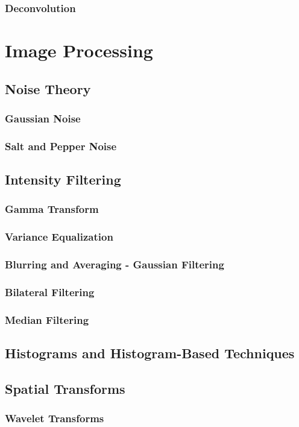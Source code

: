 \documentclass{book}
\begin{document}
				\section{Deconvolution}
			
		
		\part{Image Processing}
			\chapter{Noise Theory}
				\section{Gaussian Noise}
				\section{Salt and Pepper Noise}		
			\chapter{Intensity Filtering}
				\section{Gamma Transform}
				\section{Variance Equalization}
				\section{Blurring and Averaging - Gaussian Filtering}
				\section{Bilateral Filtering}
				\section{Median Filtering}
			\chapter{Histograms and Histogram-Based Techniques}
			\chapter{Spatial Transforms}
				\section{Wavelet Transforms}
\end{document}
